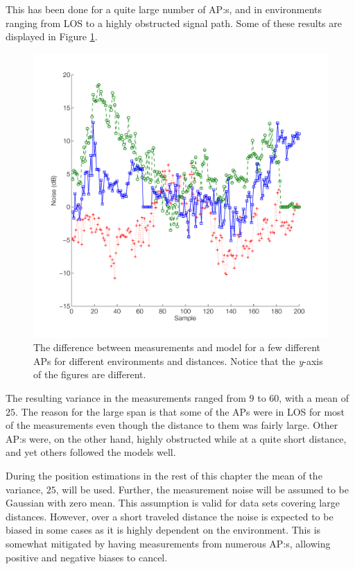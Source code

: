 \documentclass{LTHthesis}
\begin{document}
This has been done for a quite large number of AP:s, and in environments ranging from LOS to a highly obstructed signal path. Some of these results are displayed in Figure \ref{noise_behaviour}. 
%
\begin{figure}[!hbt]

\includegraphics[width=1\textwidth ]{images/pure_rssi/noise_behaviour}
\caption{The difference between measurements and model for a few different APs for different environments and distances. Notice that the \emph{y}-axis of the figures are different.}\label{noise_behaviour}
\end{figure}

The resulting variance in the measurements ranged from $9$ to $60$, with a mean of $25$. The reason for the large span is that some of the APs were in LOS for most of the measurements even though the distance to them was fairly large. Other AP:s were, on the other hand, highly obstructed while at a quite short distance, and yet others followed the models well. 

During the position estimations in the rest of this chapter the mean of the variance, $25$, will be used. Further, the measurement noise will be assumed to be Gaussian with zero mean. This assumption is valid for data sets covering large distances. However, over a short traveled distance the noise is expected to be biased in some cases as it is highly dependent on the environment. This is somewhat mitigated by having measurements from numerous AP:s, allowing positive and negative biases to cancel.
\end{document}
